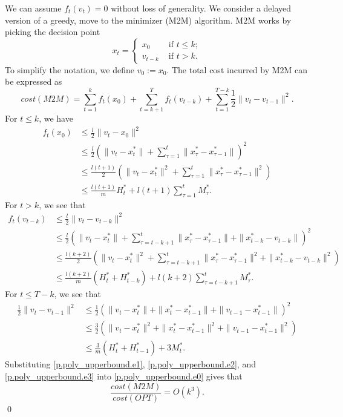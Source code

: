 We can assume $f_t(v_t) = 0$ without loss of generality. We consider a delayed version of a greedy, move to the minimizer (M2M) algorithm. M2M works by picking the decision point
\begin{equation*}
    x_t = \begin{cases}
    x_0 & \text{ if } t \leq k;\\
    v_{t- k} & \text{ if } t > k.
    \end{cases}
\end{equation*}
To simplify the notation, we define $v_0 := x_0$. The total cost incurred by M2M can be expressed as
\begin{equation}\label{p.poly_upperbound.e0}
    cost(M2M) = \sum_{t=1}^k f_t(x_0) + \sum_{t = k + 1}^{T} f_{t}(v_{t-k}) + \sum_{t = 1}^{T - k} \frac{1}{2}\|{v_t - v_{t-1}}\|^2.
\end{equation}
For $t \leq k$, we have
\begin{align}\label{p.poly_upperbound.e1}
    f_t(x_0) &\leq \frac{l}{2}\|{v_t - x_0}\|^2\nonumber\\
    &\leq \frac{l}{2} \left(\|v_t - x_t^*\| + \sum_{\tau = 1}^t \|x_\tau^* - x_{\tau-1}^*\|\right)^2\nonumber\\
    &\leq \frac{l(t+1)}{2} \left(\|v_t - x_t^*\|^2 + \sum_{\tau = 1}^t \|x_\tau^* - x_{\tau-1}^*\|^2\right)\nonumber\\
    &\leq \frac{l(t+1)}{m}H_t^* + l(t+1) \sum_{\tau = 1}^t M_\tau^*.
\end{align}
For $t > k$, we see that
\begin{align}\label{p.poly_upperbound.e2}
    f_t(v_{t-k}) &\leq \frac{l}{2}\|{v_t - v_{t-k}}\|^2\nonumber\\
    &\leq \frac{l}{2}\left(\|v_t - x_t^*\| + \sum_{\tau = t - k + 1}^t \|x_\tau^* - x_{\tau-1}^*\| + \|x_{t-k}^* - v_{t-k}\|\right)^2\nonumber\\
    &\leq \frac{l(k+2)}{2} \left(\|v_t - x_t^*\|^2 + \sum_{\tau = t - k + 1}^t \|x_\tau^* - x_{\tau-1}^*\|^2 + \|x_{t-k}^* - v_{t-k}\|^2\right)\nonumber\\
    &\leq \frac{l(k+2)}{m}(H_t^* + H_{t-k}^*) + l(k+2) \sum_{\tau = t - k + 1}^t M_\tau^*.
\end{align}
For $t \leq T - k$, we see that
\begin{align}\label{p.poly_upperbound.e3}
    \frac{1}{2}\|{v_t - v_{t-1}}\|^2 &\leq \frac{1}{2}\left(\|v_t - x_t^*\| + \|x_t^* - x_{t-1}^*\| + \|v_{t-1} - x_{t-1}^*\|\right)^2\nonumber\\
    &\leq \frac{3}{2}\left(\|v_t - x_t^*\|^2 + \|x_t^* - x_{t-1}^*\|^2 + \|v_{t-1} - x_{t-1}^*\|^2\right)\nonumber\\
    &\leq \frac{3}{m}(H_t^* + H_{t-1}^*) + 3 M_t^*.
\end{align}
Substituting \eqref{p.poly_upperbound.e1}, \eqref{p.poly_upperbound.e2}, and \eqref{p.poly_upperbound.e3} into \eqref{p.poly_upperbound.e0} gives that
\[\frac{cost(M2M)}{cost(OPT)} = O(k^3).\]
\qed
